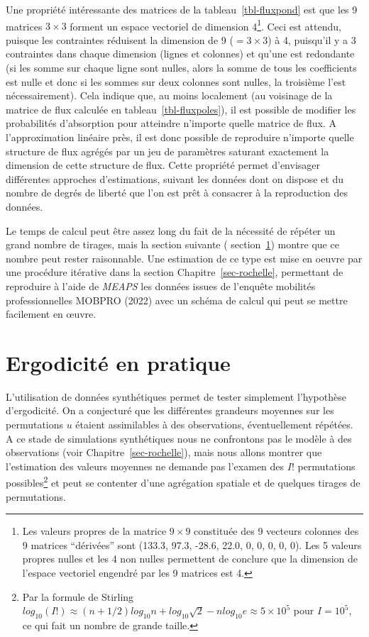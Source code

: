 \documentclass[
  10pt,
  a4paper,
  numbers=noendperiod,
  DIV=9]{scrreprt}
\begin{document}
Une propriété intéressante des matrices de la tableau~\ref{tbl-fluxpond}
est que les 9 matrices \(3 \times 3\) forment un espace vectoriel de
dimension 4\footnote{Les valeurs propres de la matrice \(9 \times 9\)
  constituée des 9 vecteurs colonnes des 9 matrices ``dérivées'' sont
  (133.3, 97.3, -28.6, 22.0, 0, 0, 0, 0, 0). Les 5 valeurs propres
  nulles et les 4 non nulles permettent de conclure que la dimension de
  l'espace vectoriel engendré par les 9 matrices est 4.}. Ceci est
attendu, puisque les contraintes réduisent la dimension de 9
(\(=3\times 3\)) à 4, puisqu'il y a 3 contraintes dans chaque dimension
(lignes et colonnes) et qu'une est redondante (si les somme sur chaque
ligne sont nulles, alors la somme de tous les coefficients est nulle et
donc si les sommes sur deux colonnes sont nulles, la troisième l'est
nécessairement). Cela indique que, au moins localement (au voisinage de
la matrice de flux calculée en tableau~\ref{tbl-fluxpoles}), il est
possible de modifier les probabilités d'absorption pour atteindre
n'importe quelle matrice de flux. A l'approximation linéaire près, il
est donc possible de reproduire n'importe quelle structure de flux
agrégés par un jeu de paramètres saturant exactement la dimension de
cette structure de flux. Cette propriété permet d'envisager différentes
approches d'estimations, suivant les données dont on dispose et du
nombre de degrés de liberté que l'on est prêt à consacrer à la
reproduction des données.

Le temps de calcul peut être assez long du fait de la nécessité de
répéter un grand nombre de tirages, mais la section suivante (
section~\ref{sec-ergemp}) montre que ce nombre peut rester raisonnable.
Une estimation de ce type est mise en oeuvre par une procédure itérative
dans la section Chapitre~\ref{sec-rochelle}, permettant de reproduire à
l'aide de \emph{MEAPS} les données issues de l'enquête mobilités
professionnelles MOBPRO (2022) avec un schéma de calcul qui peut se
mettre facilement en œuvre.

\hypertarget{sec-ergemp}{%
\section{Ergodicité en pratique}\label{sec-ergemp}}

L'utilisation de données synthétiques permet de tester simplement
l'hypothèse d'ergodicité. On a conjecturé que les différentes grandeurs
moyennes sur les permutations \(u\) étaient assimilables à des
observations, éventuellement répétées. A ce stade de simulations
synthétiques nous ne confrontons pas le modèle à des observations (voir
Chapitre~\ref{sec-rochelle}), mais nous allons montrer que l'estimation
des valeurs moyennes ne demande pas l'examen des \(I!\) permutations
possibles\footnote{Par la formule de Stirling
  \(log_{10}(I!) \approx (n +1/2)log_{10} n +log_{10}\sqrt{2} - n log_{10}e \approx 5\times10^5\)
  pour \(I=10^5\), ce qui fait un nombre de grande taille.} et peut se
contenter d'une agrégation spatiale et de quelques tirages de
permutations.
\end{document}
